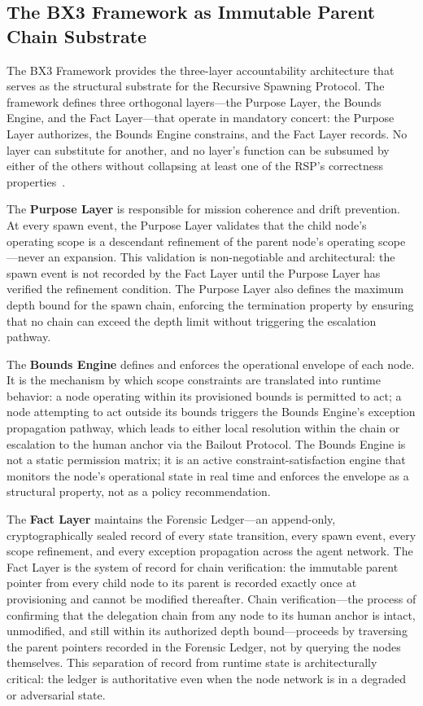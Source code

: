 \subsection{The BX3 Framework as Immutable Parent Chain Substrate}
\label{sec:rs-bx3-substrate}

The BX3 Framework provides the three-layer accountability architecture that serves as the structural substrate for the Recursive Spawning Protocol. The framework defines three orthogonal layers---the Purpose Layer, the Bounds Engine, and the Fact Layer---that operate in mandatory concert: the Purpose Layer authorizes, the Bounds Engine constrains, and the Fact Layer records. No layer can substitute for another, and no layer's function can be subsumed by either of the others without collapsing at least one of the RSP's correctness properties~\cite{bx3_recursive_spawning_integration}.

The \textbf{Purpose Layer} is responsible for mission coherence and drift prevention. At every spawn event, the Purpose Layer validates that the child node's operating scope is a descendant refinement of the parent node's operating scope---never an expansion. This validation is non-negotiable and architectural: the spawn event is not recorded by the Fact Layer until the Purpose Layer has verified the refinement condition. The Purpose Layer also defines the maximum depth bound for the spawn chain, enforcing the termination property by ensuring that no chain can exceed the depth limit without triggering the escalation pathway.

The \textbf{Bounds Engine} defines and enforces the operational envelope of each node. It is the mechanism by which scope constraints are translated into runtime behavior: a node operating within its provisioned bounds is permitted to act; a node attempting to act outside its bounds triggers the Bounds Engine's exception propagation pathway, which leads to either local resolution within the chain or escalation to the human anchor via the Bailout Protocol. The Bounds Engine is not a static permission matrix; it is an active constraint-satisfaction engine that monitors the node's operational state in real time and enforces the envelope as a structural property, not as a policy recommendation.

The \textbf{Fact Layer} maintains the Forensic Ledger---an append-only, cryptographically sealed record of every state transition, every spawn event, every scope refinement, and every exception propagation across the agent network. The Fact Layer is the system of record for chain verification: the immutable parent pointer from every child node to its parent is recorded exactly once at provisioning and cannot be modified thereafter. Chain verification---the process of confirming that the delegation chain from any node to its human anchor is intact, unmodified, and still within its authorized depth bound---proceeds by traversing the parent pointers recorded in the Forensic Ledger, not by querying the nodes themselves. This separation of record from runtime state is architecturally critical: the ledger is authoritative even when the node network is in a degraded or adversarial state.

